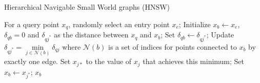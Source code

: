 \documentclass[11pt,a4paper,]{article}
\begin{document}
\begin{algorithm}[!htb]
  \caption{Hierarchical Navigable Small World graphs (HNSW)}
  \label{alg:hnsw}
  \begin{algorithmic}[1]
  \STATE For a query point $x_q$, randomly select an entry point $x_e$;
  \STATE Initialize $x_b\leftarrow x_e$, $\delta_{qb}=0$ and $\delta_{qj^*}$ as the distance between $x_q$ and $x_b$;
  \STATE Set $\delta_{qb}\leftarrow\delta_{qj^*}$;
  \STATE Update $\delta_{qj^*}=\underset{j\in\mathcal{N}(b)}{\min}\delta_{qj}$ where $\mathcal{N}(b)$ is a set of indices for points connected to $x_b$ by exactly one edge. Set $x_{j*}$ to the value of $x_j$ that achieves this minimum;
  \STATE Set $x_b\leftarrow x_{j^*}$;
  \ENDWHILE
  \RETURN $x_b$
  \end{algorithmic}
\end{algorithm}
\end{document}
